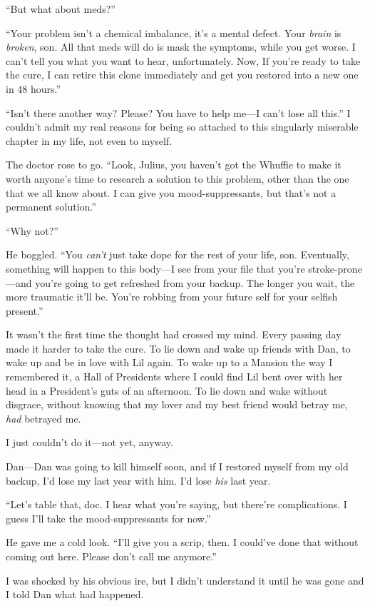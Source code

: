 “But what about meds?”

“Your problem isn't a chemical imbalance, it's a mental defect.
Your \emph{brain} is \emph{broken}, son. All that meds will do is
mask the symptoms, while you get worse. I can't tell you what you
want to hear, unfortunately. Now, If you're ready to take the cure,
I can retire this clone immediately and get you restored into a new
one in 48 hours.”

“Isn't there another way? Please? You have to help me—I can't lose
all this.” I couldn't admit my real reasons for being so attached
to this singularly miserable chapter in my life, not even to
myself.

The doctor rose to go. “Look, Julius, you haven't got the Whuffie
to make it worth anyone's time to research a solution to this
problem, other than the one that we all know about. I can give you
mood-suppressants, but that's not a permanent solution.”

“Why not?”

He boggled. “You \emph{can't} just take dope for the rest of your
life, son. Eventually, something will happen to this body—I see
from your file that you're stroke-prone—and you're going to get
refreshed from your backup. The longer you wait, the more traumatic
it'll be. You're robbing from your future self for your selfish
present.”

It wasn't the first time the thought had crossed my mind. Every
passing day made it harder to take the cure. To lie down and wake
up friends with Dan, to wake up and be in love with Lil again. To
wake up to a Mansion the way I remembered it, a Hall of Presidents
where I could find Lil bent over with her head in a President's
guts of an afternoon. To lie down and wake without disgrace,
without knowing that my lover and my best friend would betray me,
\emph{had} betrayed me.

I just couldn't do it—not yet, anyway.

Dan—Dan was going to kill himself soon, and if I restored myself
from my old backup, I'd lose my last year with him. I'd lose
\emph{his} last year.

“Let's table that, doc. I hear what you're saying, but there're
complications. I guess I'll take the mood-suppressants for now.”

He gave me a cold look. “I'll give you a scrip, then. I could've
done that without coming out here. Please don't call me anymore.”

I was shocked by his obvious ire, but I didn't understand it until
he was gone and I told Dan what had happened.

